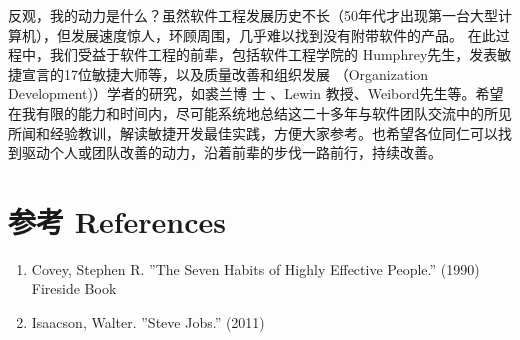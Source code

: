 
反观，我的动力是什么？虽然软件工程发展历史不长（50年代才出现第一台大型计算机），但发展速度惊人，环顾周围，几乎难以找到没有附带软件的产品。 
在此过程中，我们受益于软件工程的前辈，包括软件工程学院的 Humphrey先生，发表敏捷宣言的17位敏捷大师等，以及质量改善和组织发展 （Organization Development)）学者的研究，如裘兰博
士 、Lewin 教授、Weibord先生等。希望在我有限的能力和时间内，尽可能系统地总结这二十多年与软件团队交流中的所见所闻和经验教训，解读敏捷开发最佳实践，方便大家参考。也希望各位同仁可以找到驱动个人或团队改善的动力，沿着前辈的步伐一路前行，持续改善。 

\hypertarget{ux53c2ux8003-references}{%
\section{参考 References}\label{ux53c2ux8003-references}}

\begin{enumerate}
\tightlist
\item
  Covey, Stephen R. ''The Seven Habits of Highly Effective People.'' (1990) Fireside Book 
\item
   Isaacson, Walter. ''Steve Jobs.'' (2011)
\end{enumerate}



